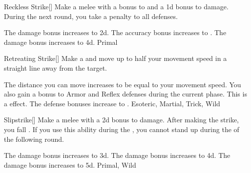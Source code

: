 \lowercase{\hypertarget{maneuver:Reckless Strike}{}}\label{maneuver:Reckless Strike}
\hypertarget{maneuver:Reckless Strike}{}
\begin{freeability}[Rank 1]{Reckless Strike}[]
Make a melee  with a  bonus to  and a \plus1d bonus to damage.
During the next round, you take a  penalty to all defenses.

\rankline
{} The damage bonus increases to \plus2d.
 The accuracy bonus increases to .
 The damage bonus increases to \plus4d.
 Primal
\end{freeability}
\vspace{0.25em}



\lowercase{\hypertarget{maneuver:Retreating Strike}{}}\label{maneuver:Retreating Strike}
\hypertarget{maneuver:Retreating Strike}{}
\begin{freeability}[Rank 1]{Retreating Strike}[]
Make a  and move up to half your movement speed in a straight line away from the target.

\rankline
{} The distance you can move increases to be equal to your movement speed.
 You also gain a  bonus to Armor and Reflex defenses during the current phase. This is a  effect.
 The defense bonuses increase to .
 Esoteric, Martial, Trick, Wild
\end{freeability}
\vspace{0.25em}



\lowercase{\hypertarget{maneuver:Slipstrike}{}}\label{maneuver:Slipstrike}
\hypertarget{maneuver:Slipstrike}{}
\begin{freeability}[Rank 1]{Slipstrike}[]
Make a melee  with a \plus2d bonus to damage.
After making the strike, you fall .
If you use this ability during the , you cannot stand up during the  of the following round.

\rankline
{} The damage bonus increases to \plus3d.
 The damage bonus increases to \plus4d.
 The damage bonus increases to \plus5d.
 Primal, Wild
\end{freeability}
\vspace{0.25em}



